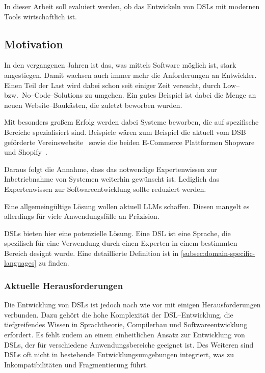 In dieser Arbeit soll evaluiert werden, ob das Entwickeln von \acp{DSL} mit modernen Tools wirtschaftlich ist.

\subsection{Motivation}\label{subsec:motivation}
In den vergangenen Jahren ist das, was mittels Software möglich ist, stark angestiegen.
Damit wachsen auch immer mehr die Anforderungen an Entwickler.
Einen Teil der Last wird dabei schon seit einiger Zeit versucht, durch Low-- bzw.\ No--Code--Solutions zu umgehen.
Ein gutes Beispiel ist dabei die Menge an neuen Website--Baukästen, die zuletzt beworben wurden. \autocite{p-2024}

Mit besonders großem Erfolg werden dabei Systeme beworben, die auf spezifische Bereiche spezialisiert sind.
Beispiele wären zum Beispiel die aktuell vom DSB geförderte Vereinswebsite~\autocite{deutscher-olympischer-sportbund-ev-no-date} sowie die beiden E-Commerce Plattformen Shopware~\autocite{shopware-ag-no-date} und Shopify~\autocite{shopify-international-ltd-no-date}.

Daraus folgt die Annahme, dass das notwendige Expertenwissen zur Inbetriebnahme von Systemen weiterhin gewünscht ist.
Lediglich das Expertenwissen zur Softwareentwicklung sollte reduziert werden.

Eine allgemeingültige Lösung wollen aktuell \acp{LLM} schaffen.
Diesen mangelt es allerdings für viele Anwendungsfälle an Präzision.

\acp{DSL} bieten hier eine potenzielle Lösung.
Eine \ac{DSL} ist eine Sprache, die spezifisch für eine Verwendung durch einen Experten in einem bestimmten Bereich designt wurde.
Eine detaillierte Definition ist in \autoref{subsec:domain-specific-languages} zu finden.

\subsubsection{Aktuelle Herausforderungen}
Die Entwicklung von \acp{DSL} ist jedoch nach wie vor mit einigen Herausforderungen verbunden.
Dazu gehört die hohe Komplexität der \acs{DSL}--Entwicklung, die tiefgreifendes Wissen in Sprachtheorie, Compilerbau und Softwareentwicklung erfordert.
Es fehlt zudem an einem einheitlichen Ansatz zur Entwicklung von \acp{DSL}, der für verschiedene Anwendungsbereiche geeignet ist.
Des Weiteren sind \acp{DSL} oft nicht in bestehende Entwicklungsumgebungen integriert, was zu Inkompatibilitäten und Fragmentierung führt.

